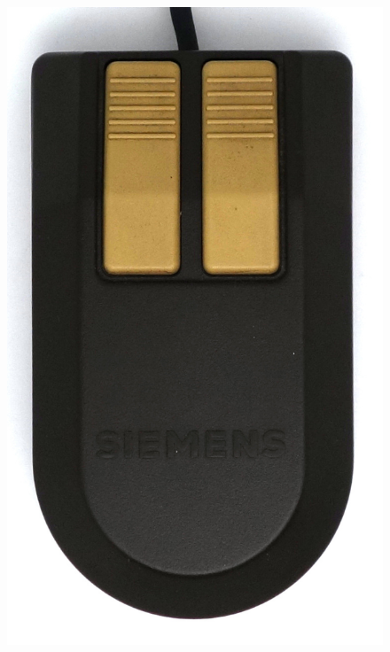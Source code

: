 \documentclass[11pt, a4paper]{article}
\begin{document}
\begin{figure}[h]
    \centering
    \includegraphics[scale=0.5]{1985_siemens_pcd_mouse/top_30.jpg}

\end{figure}
\end{document}

